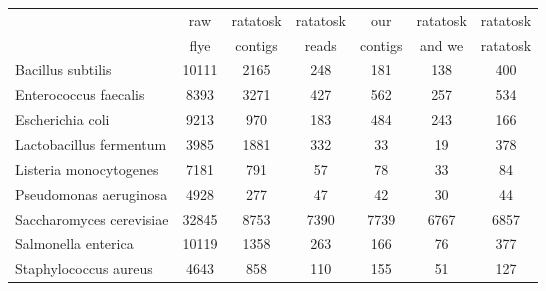 \begin{minipage}{0.91\textwidth}
\begin{adjustbox}{center}
\begin{tabular}{|l||c|c|c|c|c|c|}
\hline
 & raw & ratatosk & ratatosk & our & ratatosk & ratatosk \\
 & flye & contigs & reads & contigs & and we & ratatosk \\
\hline
\hline
Bacillus subtilis & \cellcolor[RGB]{235, 71, 71} 10111 & \cellcolor[RGB]{235, 71, 71} 2165 & \cellcolor[RGB]{241, 241, 253} 248 & \cellcolor[RGB]{227, 227, 252} 181 & \cellcolor[RGB]{218, 218, 251} 138 & \cellcolor[RGB]{253, 237, 237} 400 \\
\hline
Enterococcus faecalis & \cellcolor[RGB]{235, 71, 71} 8393 & \cellcolor[RGB]{235, 71, 71} 3271 & \cellcolor[RGB]{223, 223, 251} 427 & \cellcolor[RGB]{254, 250, 250} 562 & \cellcolor[RGB]{172, 172, 246} 257 & \cellcolor[RGB]{250, 250, 254} 534 \\
\hline
Escherichia coli & \cellcolor[RGB]{235, 71, 71} 9213 & \cellcolor[RGB]{235, 71, 71} 970 & \cellcolor[RGB]{227, 227, 252} 183 & \cellcolor[RGB]{253, 237, 237} 484 & \cellcolor[RGB]{237, 237, 253} 243 & \cellcolor[RGB]{227, 227, 252} 166 \\
\hline
Lactobacillus fermentum & \cellcolor[RGB]{235, 71, 71} 3985 & \cellcolor[RGB]{235, 71, 71} 1881 & \cellcolor[RGB]{250, 250, 254} 332 & \cellcolor[RGB]{218, 218, 251} 33 & \cellcolor[RGB]{218, 218, 251} 19 & \cellcolor[RGB]{254, 250, 250} 378 \\
\hline
Listeria monocytogenes & \cellcolor[RGB]{235, 71, 71} 7181 & \cellcolor[RGB]{235, 71, 71} 791 & \cellcolor[RGB]{223, 223, 251} 57 & \cellcolor[RGB]{250, 250, 254} 78 & \cellcolor[RGB]{186, 186, 247} 33 & \cellcolor[RGB]{254, 250, 250} 84 \\
\hline
Pseudomonas aeruginosa & \cellcolor[RGB]{235, 71, 71} 4928 & \cellcolor[RGB]{235, 71, 71} 277 & \cellcolor[RGB]{253, 241, 241} 47 & \cellcolor[RGB]{227, 227, 252} 42 & \cellcolor[RGB]{94, 94, 237} 30 & \cellcolor[RGB]{241, 241, 253} 44 \\
\hline
Saccharomyces cerevisiae & \cellcolor[RGB]{235, 71, 71} 32845 & \cellcolor[RGB]{247, 182, 182} 8753 & \cellcolor[RGB]{246, 246, 254} 7390 & \cellcolor[RGB]{254, 246, 246} 7739 & \cellcolor[RGB]{218, 218, 251} 6767 & \cellcolor[RGB]{223, 223, 251} 6857 \\
\hline
Salmonella enterica & \cellcolor[RGB]{235, 71, 71} 10119 & \cellcolor[RGB]{235, 71, 71} 1358 & \cellcolor[RGB]{246, 246, 254} 263 & \cellcolor[RGB]{223, 223, 251} 166 & \cellcolor[RGB]{209, 209, 250} 76 & \cellcolor[RGB]{253, 241, 241} 377 \\
\hline
Staphylococcus aureus & \cellcolor[RGB]{235, 71, 71} 4643 & \cellcolor[RGB]{235, 71, 71} 858 & \cellcolor[RGB]{227, 227, 252} 110 & \cellcolor[RGB]{253, 241, 241} 155 & \cellcolor[RGB]{172, 172, 246} 51 & \cellcolor[RGB]{241, 241, 253} 127 \\
\hline
\end{tabular}
\end{adjustbox}
\end{minipage}
